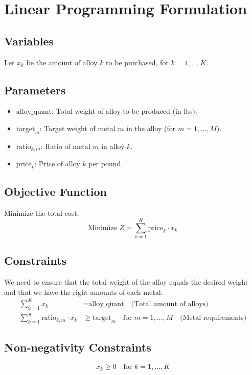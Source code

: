\documentclass{article}
\begin{document}
\section*{Linear Programming Formulation}

\subsection*{Variables}
Let \( x_k \) be the amount of alloy \( k \) to be purchased, for \( k = 1, \ldots, K \).

\subsection*{Parameters}
\begin{itemize}
    \item \( \text{alloy\_quant} \): Total weight of alloy to be produced (in lbs).
    \item \( \text{target}_{m} \): Target weight of metal \( m \) in the alloy (for \( m = 1, \ldots, M \)).
    \item \( \text{ratio}_{k, m} \): Ratio of metal \( m \) in alloy \( k \).
    \item \( \text{price}_{k} \): Price of alloy \( k \) per pound.
\end{itemize}

\subsection*{Objective Function}
Minimize the total cost:
\[
\text{Minimize } Z = \sum_{k=1}^{K} \text{price}_{k} \cdot x_k
\]

\subsection*{Constraints}
We need to ensure that the total weight of the alloy equals the desired weight and that we have the right amounts of each metal:
\begin{align*}
\sum_{k=1}^{K} x_k &= \text{alloy\_quant} \quad \text{(Total amount of alloys)} \\
\sum_{k=1}^{K} \text{ratio}_{k, m} \cdot x_k &\geq \text{target}_{m} \quad \text{for } m = 1, \ldots, M \quad \text{(Metal requirements)}
\end{align*}

\subsection*{Non-negativity Constraints}
\[
x_k \geq 0 \quad \text{for } k = 1, \ldots, K
\]
\end{document}
